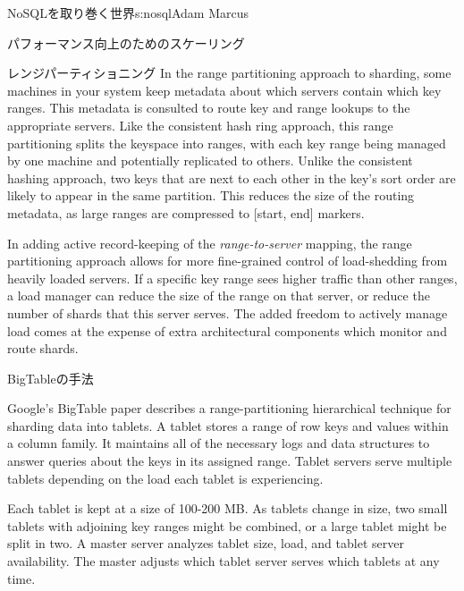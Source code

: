 \begin{aosachapter}{NoSQLを取り巻く世界}{s:nosql}{Adam Marcus}
\begin{aosasect1}{パフォーマンス向上のためのスケーリング}
\begin{aosasect2}{レンジパーティショニング}
In the range partitioning approach to sharding, some machines in your
system keep metadata about which servers contain which key ranges.
This metadata is consulted to route key and range lookups to the
appropriate servers.  Like the consistent hash ring approach, this
range partitioning splits the keyspace into ranges, with each key
range being managed by one machine and potentially replicated to
others.  Unlike the consistent hashing approach, two keys that are
next to each other in the key's sort order are likely to appear in the
same partition.  This reduces the size of the routing metadata, as
large ranges are compressed to [start, end] markers.

In adding active record-keeping of the \emph{range-to-server} mapping,
the range partitioning approach allows for more fine-grained control
of load-shedding from heavily loaded servers.  If a specific key range
sees higher traffic than other ranges, a load manager can reduce the
size of the range on that server, or reduce the number of shards that
this server serves.  The added freedom to actively manage load comes
at the expense of extra architectural components which monitor and
route shards.

\vspace{-0.1cm} %
\begin{aosasect3}{BigTableの手法}

Google's BigTable paper describes a range-partitioning hierarchical
technique for sharding data into tablets.  A tablet stores a range of
row keys and values within a column family.  It maintains all
of the necessary logs and data structures to answer queries about the
keys in its assigned range.  Tablet servers serve multiple tablets
depending on the load each tablet is experiencing.

Each tablet is kept at a size of 100-200 MB\@.  As tablets change in size, two 
small tablets with adjoining key ranges might be combined, or a large tablet might be
split in two.  A master server analyzes tablet size,
load, and tablet server availability.  The master adjusts which tablet
server serves which tablets at any time.



\end{aosasect3}
\end{aosasect2}
\end{aosasect1}
\end{aosachapter}
